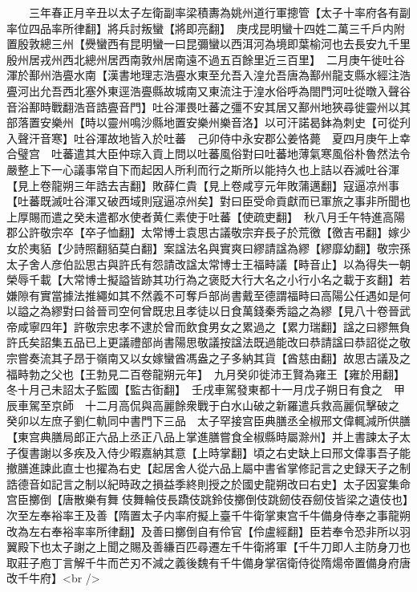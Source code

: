 　　三年春正月辛丑以太子左衛副率梁積夀為姚州道行軍摠管【太子十率府各有副率位四品率所律翻】將兵討叛蠻【將即亮翻】　庚戌昆明蠻十四姓二萬三千戶内附置殷敦總三州【㸑蠻西有昆明蠻一曰昆彌蠻以西洱河為境即葉榆河也去長安九千里殷州居戎州西北總州居西南敦州居南遠不過五百餘里近三百里】　二月庚午徙吐谷渾於鄯州浩亹水南【漢書地理志浩亹水東至允吾入湟允吾唐為鄯州龍支縣水經注浩亹河出允吾西北塞外東逕浩亹縣故城南又東流注于湟水俗呼為閤門河吐從暾入聲谷音浴鄯時戰翻浩音誥亹音門】吐谷渾畏吐蕃之彊不安其居又鄯州地狹尋徙靈州以其部落置安樂州【時以靈州鳴沙縣地置安樂州樂音洛】以可汗諾曷鉢為刺史【可從刋入聲汗音寒】吐谷渾故地皆入於吐蕃　己卯侍中永安郡公姜恪薨　夏四月庚午上幸合璧宫　吐蕃遣其大臣仲琮入貢上問以吐蕃風俗對曰吐蕃地薄氣寒風俗朴魯然法令嚴整上下一心議事常自下而起因人所利而行之斯所以能持久也上詰以吞滅吐谷渾【見上卷龍朔三年誥去吉翻】敗薛仁貴【見上卷咸亨元年敗蒲邁翻】寇逼凉州事【吐蕃既滅吐谷渾又破西域則寇逼凉州矣】對曰臣受命貢獻而已軍旅之事非所聞也上厚賜而遣之癸未遣都水使者黄仁素使于吐蕃【使疏吏翻】　秋八月壬午特進高陽郡公許敬宗卒【卒子恤翻】太常博士袁思古議敬宗弃長子於荒徼【徼吉弔翻】嫁少女於夷貊【少詩照翻貊莫白翻】案諡法名與實爽曰繆請諡為繆【繆靡幼翻】敬宗孫太子舍人彦伯訟思古與許氏有怨請改諡太常博士王福畤議【畤音止】以為得失一朝榮辱千載【大常博士擬謚皆跡其功行為之褒貶大行大名之小行小名之載于亥翻】若嫌隙有實當據法推繩如其不然義不可奪戶部尚書戴至德謂福畤曰高陽公任遇如是何以謚之為繆對曰㫺晉司空何曾既忠且孝徒以日食萬錢秦秀謚之為繆【見八十卷晉武帝咸寧四年】許敬宗忠孝不逮於曾而飲食男女之累過之【累力瑞翻】諡之曰繆無負許氏矣詔集五品已上更議禮部尚書陽思敬議按諡法既過能改曰恭請諡曰恭詔從之敬宗嘗奏流其子昂于嶺南又以女嫁蠻酋馮盎之子多納其貨【酋慈由翻】故思古議及之福畤勃之父也【王勃見二百卷龍朔元年】　九月癸卯徙沛王賢為雍王【雍於用翻】冬十月己未詔太子監國【監古衘翻】　壬戌車駕發東都十一月戊子朔日有食之　甲辰車駕至京師　十二月高侃與高麗餘衆戰于白水山破之新羅遣兵救高麗侃擊破之　癸卯以左庶子劉仁軌同中書門下三品　太子罕接宫臣典膳丞全椒邢文偉輒減所供膳【東宫典膳局郎正六品上丞正八品上掌進膳嘗食全椒縣時屬滁州】并上書諫太子太子復書謝以多疾及入侍少暇嘉納其意【上時掌翻】頃之右史缺上曰邢文偉事吾子能撤膳進諫此直士也擢為右史【起居舍人從六品上屬中書省掌修記言之史録天子之制誥德音如記言之制以紀時政之損益季終則授之於國史龍朔改曰右史】太子因宴集命宫臣擲倒【唐散樂有舞伎舞輪伎長蹻伎跳鈴伎擲倒伎跳劒伎吞劒伎皆梁之遺伎也】次至左奉裕率王及善【隋置太子内率府擬上臺千牛衛掌東宫千牛備身侍奉之事龍朔改為左右奉裕率率所律翻】及善曰擲倒自有伶官【伶盧經翻】臣若奉令恐非所以羽翼殿下也太子謝之上聞之賜及善縑百匹尋遷左千牛衛將軍【千牛刀即人主防身刀也取莊子庖丁言解千牛而芒刃不減之義後魏有千牛備身掌宿衛侍從隋煬帝置備身府唐改千牛府】<br />
